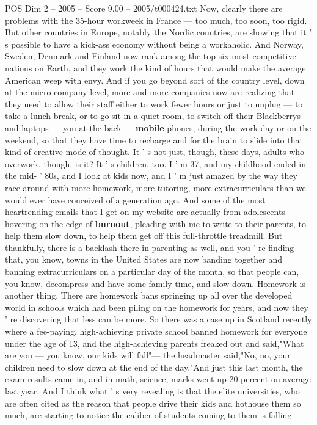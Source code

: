 \begin{textsample}{POS Dim 2 – 2005 – Score 9.00 – 2005/t000424.txt}
Now, clearly there are problems with the 35-hour workweek in France — too much, too soon, too rigid.
But other countries in Europe, notably the Nordic countries, are showing that it ' s possible to have a kick-ass economy without being a workaholic.
And Norway, Sweden, Denmark and Finland now rank among the top six most competitive nations on Earth, and they work the kind of hours that would make the average American weep with envy.
And if you go beyond sort of the country level, down at the micro-company level, more and more companies now are realizing that they need to allow their staff either to work fewer hours or just to unplug — to take a lunch break, or to go sit in a quiet room, to switch off their Blackberrys and laptops — you at the back — \textbf{mobile} phones, during the work day or on the weekend, so that they have time to recharge and for the brain to slide into that kind of creative mode of thought.
It ' s not just, though, these days, adults who overwork, though, is it?
It ' s children, too.
I ' m 37, and my childhood ended in the mid- ' 80s, and I look at kids now, and I ' m just amazed by the way they race around with more homework, more tutoring, more extracurriculars than we would ever have conceived of a generation ago.
And some of the most heartrending emails that I get on my website are actually from adolescents hovering on the edge of \textbf{burnout}, pleading with me to write to their parents, to help them slow down, to help them get off this full-throttle treadmill.
But thankfully, there is a backlash there in parenting as well, and you ' re finding that, you know, towns in the United States are now banding together and banning extracurriculars on a particular day of the month, so that people can, you know, decompress and have some family time, and slow down.
Homework is another thing.
There are homework bans springing up all over the developed world in schools which had been piling on the homework for years, and now they ' re discovering that less can be more.
So there was a case up in Scotland recently where a fee-paying, high-achieving private school banned homework for everyone under the age of 13, and the high-achieving parents freaked out and said,"What are you — you know, our kids will fall"— the headmaster said,"No, no, your children need to slow down at the end of the day."And just this last month, the exam results came in, and in math, science, marks went up 20 percent on average last year.
And I think what ' s very revealing is that the elite universities, who are often cited as the reason that people drive their kids and hothouse them so much, are starting to notice the caliber of students coming to them is falling.

\end{textsample}
